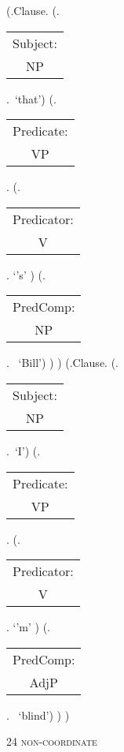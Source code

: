 \documentclass[12pt,letterpaper]{article}
\begin{document}
\begin{figure}
	\begin{center}
		\begin{parsetree}
			(.Clause.
			(.\begin{tabular}{c}Subject:\\NP\end{tabular}.~`that')
			(.\begin{tabular}{c}Predicate:\\VP\end{tabular}.
			(.\begin{tabular}{c}Predicator:\\V\end{tabular}. `{'s}' )
			(.\begin{tabular}{c}PredComp:\\NP\end{tabular}.~ 
			`Bill')
			)
			)
			(.Clause.
			(.\begin{tabular}{c}Subject:\\NP\end{tabular}.~`I')
			(.\begin{tabular}{c}Predicate:\\VP\end{tabular}.
			(.\begin{tabular}{c}Predicator:\\V\end{tabular}. `{'m}' )
			(.\begin{tabular}{c}PredComp:\\AdjP\end{tabular}.~ 
			`blind')
			)
			)
			
			\hfill \break\hfill \break
		\end{parsetree}
		24 \textsc{non-coordinate}
	\end{center}
\end{figure}
\end{document}
